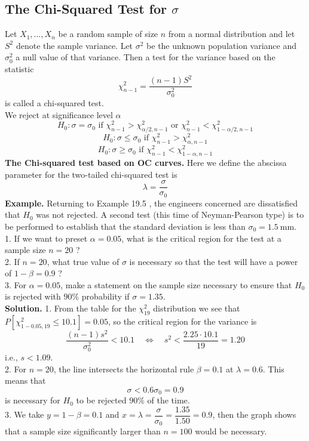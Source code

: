 \documentclass[a4paper,12pt]{article}
\begin{document}
\subsection{The Chi-Squared Test for $\sigma$}
Let $X_1, \ldots, X_n$ be a random sample of size $n$ from a normal distribution and let $S^2$ denote the sample variance. Let $\sigma^2$ be the unknown population variance and $\sigma_0^2$ a null value of that variance. Then a test for the variance based on the statistic
\begin{equation}
\chi_{n-1}^2=\frac{(n-1) S^2}{\sigma_0^2}
\end{equation}
is called a chi-squared test. \\
We reject at significance level $\alpha$
$$H_0: \sigma=\sigma_0 \text{ if } \chi_{n-1}^2>\chi_{\alpha / 2, n-1}^2\text{ or } \chi_{n-1}^2<\chi_{1-\alpha / 2, n-1}^2$$
$$H_0: \sigma \leq \sigma_0\text{ if }\chi_{n-1}^2>\chi_{\alpha, n-1}^2$$
$$H_0: \sigma \geq \sigma_0\text{ if }\chi_{n-1}^2<\chi_{1-\alpha, n-1}^2$$
\textbf{The Chi-squared test based on OC curves.} Here we define the abscissa parameter for the two-tailed chi-squared test is 
\begin{equation}
    \lambda = \dfrac{\sigma}{\sigma_0}
\end{equation}
\textbf{Example.} Returning to Example 19.5 , the engineers concerned are dissatisfied that $H_0$ was not rejected. A second test (this time of Neyman-Pearson type) is to be performed to establish that the standard deviation is less than $\sigma_0=1.5 \mathrm{~mm}$.\\
1. If we want to preset $\alpha=0.05$, what is the critical region for the test at a sample size $n=20$ ?\\
2. If $n=20$, what true value of $\sigma$ is necessary so that the test will have a power of $1-\beta=0.9$ ?\\
3. For $\alpha=0.05$, make a statement on the sample size necessary to ensure that $H_0$ is rejected with $90 \%$ probability if $\sigma=1.35$.\\
\textbf{Solution.} 1. From the table for the $\chi_{19}^2$ distribution we see that $P\left[\chi_{1-0.05,19}^2 \leq 10.1\right]=0.05$, so the critical region for the variance is
$$
\frac{(n-1) s^2}{\sigma_0^2}<10.1 \quad \Leftrightarrow \quad s^2<\frac{2.25 \cdot 10.1}{19}=1.20
$$
i.e., $s<1.09$.\\
2. For $n=20$, the line intersects the horizontal rule $\beta=0.1$ at $\lambda=0.6$. This means that
$$
\sigma<0.6 \sigma_0=0.9
$$
is necessary for $H_0$ to be rejected $90 \%$ of the time.\\
3. We take $y=1-\beta=0.1$ and $x=\lambda=\dfrac{\sigma}{\sigma_0}=\dfrac{1.35}{1.50}=0.9$, then the graph shows that a sample size significantly larger than $n=100$ would be necessary.
\end{document}
